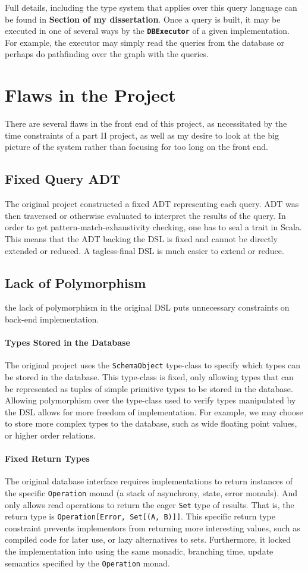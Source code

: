 \documentclass{report}
\newcommand \2[0]{\textbf{2}}
\newcommand \3[0]{\textbf{3}}
\newcommand{\todo}[1]{\textbf{#1}}
\begin{document}
Full details, including the type system that applies over this query language can be found in \todo{Section of my dissertation}. Once a query is built, it may be executed in one of several ways by the \texttt{\todo{DBExecutor}} of a given implementation. For example, the executor may simply read the queries from the database or perhaps do pathfinding over the graph with the queries.
\section{Flaws in the Project}
There are several flaws in the front end of this project, as necessitated by the time constraints of a part II project, as well as my desire to look at the big picture of the system rather than focusing for too long on the front end.
\subsection{Fixed Query ADT}
The original project constructed a fixed ADT representing each query. ADT was then traversed or otherwise evaluated to interpret the results of the query. In order to get pattern-match-exhaustivity checking, one has to seal a trait in Scala. This means that the ADT backing the DSL is fixed and cannot be directly extended or reduced. A tagless-final DSL is much easier to extend or reduce.

\subsection{Lack of Polymorphism}
the lack of polymorphism in the original DSL puts unnecessary constraints on back-end implementation.
\paragraph{Types Stored in the Database}
The original project uses the \texttt{SchemaObject} type-class to specify which types can be stored in the database. This type-class is fixed, only allowing types that can be represented as tuples of simple primitive types to be stored in the database. Allowing polymorphism over the type-class used to verify types manipulated by the DSL allows for more freedom of implementation. For example, we may choose to store more complex types to the database, such as wide floating point values, or higher order relations.

\paragraph{Fixed Return Types}
The original database interface requires implementations to return instances of the specific \texttt{Operation} monad (a stack of asynchrony, state, error monads). And only allows read operations to return the eager \texttt{Set} type of results. That is, the return type is \texttt{Operation[Error, Set[(A, B)]]}. This specific return type constraint prevents implementors from returning more interesting values, such as compiled code for later use, or lazy alternatives to sets. Furthermore, it locked the implementation into using the same monadic, branching time, update semantics specified by the \texttt{Operation} monad.
\end{document}
